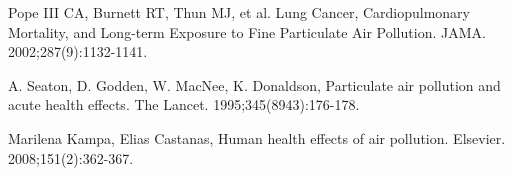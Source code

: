 

\footnotesize{

\noindent
{}
\setlength{\hangindent}{4em}
Pope III CA, Burnett RT, Thun MJ, et al. Lung Cancer, Cardiopulmonary Mortality, and Long-term Exposure to Fine Particulate Air Pollution. JAMA. 2002;287(9):1132-1141. 

\noindent
{}
\setlength{\hangindent}{4em}
A. Seaton, D. Godden, W. MacNee, K. Donaldson, Particulate air pollution and acute health effects. The Lancet. 1995;345(8943):176-178.

\noindent
{}
\setlength{\hangindent}{4em}
Marilena Kampa, Elias Castanas, Human health effects of air pollution. Elsevier. 2008;151(2):362-367.

}
